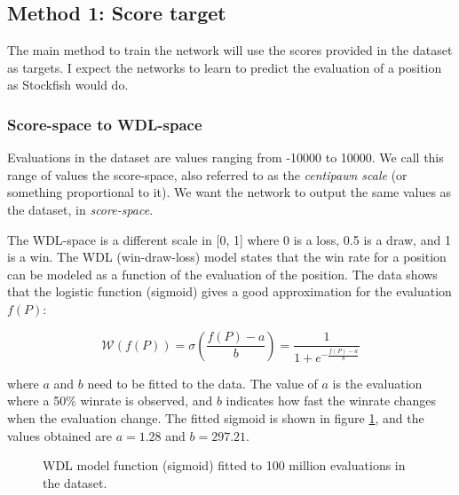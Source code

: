

\subsection{Method 1: Score target}

The main method to train the network will use the scores provided in the dataset as targets. I expect the networks to learn to predict the evaluation of a position as Stockfish would do.

\setcounter{secnumdepth}{4}
\subsubsection{Score-space to WDL-space}

Evaluations in the dataset are values ranging from -10000 to 10000. We call this range of values the score-space, also referred to as the \textit{centipawn scale} (or something proportional to it). We want the network to output the same values as the dataset, in \textit{score-space}.

The WDL-space is a different scale in [0, 1] where 0 is a loss, 0.5 is a draw, and 1 is a win. The WDL (win-draw-loss) model \cite{wdl-model} states that the win rate for a position can be modeled as a function of the evaluation of the position. The data shows that the logistic function (sigmoid) gives a good approximation for the evaluation $f(P)$:

\[
\mathcal{W}(f(P)) = \sigma\left(\frac{f(P)-a}{b}\right) = \frac{1}{1 + e^{-\frac{f(P)-a}{b}}}
\]

where $a$ and $b$ need to be fitted to the data. The value of $a$ is the evaluation where a 50\% winrate is observed, and $b$ indicates how fast the winrate changes when the evaluation change. The fitted sigmoid is shown in figure \ref{wdl-fit}, and the values obtained are $a=1.28$ and $b=297.21$.

\begin{figure}[H]
\centering
{}
\caption{WDL model function (sigmoid) fitted to 100 million evaluations in the dataset.}
\label{wdl-fit}
\end{figure}


